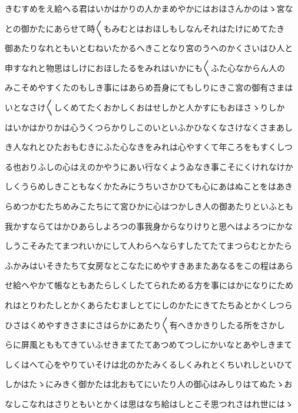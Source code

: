 \documentclass[a4paper,11pt,landscape]{ltjtarticle}
\begin{document}
\par\medskip
きむすめをえ給へる君はいかはかりの人かまめやかにはおほさんかのはゝ宮な
\par\medskip
との御かたにあらせて時〱もみむとはおほしもしなんそれはたけにめてたき
\par\medskip
御あたりなれともいとむねいたかるへきことなり宮のうへのかくさいはひ人と
\par\medskip
申すなれと物思はしけにおほしたるをみれはいかにも〱ふた心なからん人の
\par\medskip
みこそめやすくたのもしき事にはあらめ吾身にてもしりにきこ宮の御有さまは
\par\medskip
いとなさけ〱しくめてたくおかしくおはせしかと人かすにもおほさゝりしか
\par\medskip
はいかはかりかは心うくつらかりしこのいといふかひなくなさけなくさまあし
\par\medskip
き人なれとひたおもむきにふた心なきをみれは心やすくて年ころをもすくしつ
\par\medskip
る也おりふしの心はえのかやうにあい行なくようゐなき事こそにくけれなけか
\par\medskip
しくうらめしきこともなくかたみにうちいさかひても心にあはぬことをはあき
\par\medskip
らめつかむたちめみこたちにて宮ひかに心はつかしき人の御あたりといふとも
\par\medskip
我かすならてはかひあらしよろつの事我身からなりけりと思へはよろつにかな
\par\medskip
しうこそみたてまつれいかにして人わらへならすしたてたてまつらむとかたら
\par\medskip
ふかみはいそきたちて女房なとこなたにめやすきあまたあなるをこの程はあら
\par\medskip
せ給へやかて帳なともあたらしくしたてられためる方を事にはかになりにため
\par\medskip
れはとりわたしとかくあらたむましとてにしのかたにきてたちゐとかくしつら
\par\medskip
ひさはくめやすきさまにさはらかにあたり〱有へきかきりしたる所をさかし
\par\medskip
らに屏風とももてきていふせきまてたてあつめてつしにかいなとあやしきまて
\par\medskip
しくはへて心をやりていそけは北のかたみくるしくみれとくちいれしといひて
\par\medskip
しかはたゝにみきく御かたは北おもてにいたり人の御心はみしりはてぬたゝお
\par\medskip
なしこなれはさりともいとかくは思はなち給はしとこそ思つれさはれ世にはゝ
\par\medskip
\end{document}
